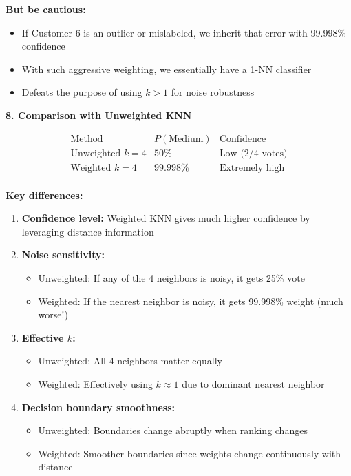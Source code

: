 \documentclass[12pt]{article}
\begin{document}
\begin{explanation}
\textbf{But be cautious:}
\begin{itemize}
    \item If Customer 6 is an outlier or mislabeled, we inherit that error with 99.998\% confidence
    \item With such aggressive weighting, we essentially have a 1-NN classifier
    \item Defeats the purpose of using \(k > 1\) for noise robustness
\end{itemize}

\textbf{8. Comparison with Unweighted KNN}

\[
\begin{array}{c|c|c}
\text{Method} & P(\text{Medium}) & \text{Confidence} \\
\hline
\text{Unweighted } k=4 & 50\% & \text{Low (2/4 votes)} \\
\text{Weighted } k=4 & 99.998\% & \text{Extremely high} \\
\end{array}
\]

\textbf{Key differences:}

\begin{enumerate}
    \item \textbf{Confidence level:} Weighted KNN gives much higher confidence by leveraging distance information

    \item \textbf{Noise sensitivity:}
    \begin{itemize}
        \item Unweighted: If any of the 4 neighbors is noisy, it gets 25\% vote
        \item Weighted: If the nearest neighbor is noisy, it gets 99.998\% weight (much worse!)
    \end{itemize}

    \item \textbf{Effective \(k\):}
    \begin{itemize}
        \item Unweighted: All 4 neighbors matter equally
        \item Weighted: Effectively using \(k \approx 1\) due to dominant nearest neighbor
    \end{itemize}

    \item \textbf{Decision boundary smoothness:}
    \begin{itemize}
        \item Unweighted: Boundaries change abruptly when ranking changes
        \item Weighted: Smoother boundaries since weights change continuously with distance
    \end{itemize}
\end{enumerate}


\end{explanation}
\end{document}
